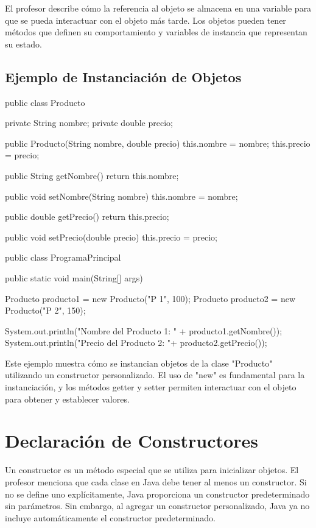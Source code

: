 \documentclass[a4paper]{report}
\begin{document}
El profesor describe cómo la referencia al objeto se almacena en una variable para que se pueda interactuar con el objeto más tarde. Los objetos pueden tener métodos que definen su comportamiento y variables de instancia que representan su estado.

\subsection{Ejemplo de Instanciación de Objetos}
\begin{roundedlst}
public class Producto {
    private String nombre;
    private double precio;

    public Producto(String nombre, double precio) {
        this.nombre = nombre;
        this.precio = precio;
    }

    public String getNombre() {
        return this.nombre;
    }

    public void setNombre(String nombre) {
        this.nombre = nombre;
    }

    public double getPrecio() {
       return this.precio;
    }

    public void setPrecio(double precio) {
        this.precio = precio;
    }
}

public class ProgramaPrincipal {
    public static void main(String[] args) {
        Producto producto1 = new Producto("P 1", 100);
        Producto producto2 = new Producto("P 2", 150);

        System.out.println("Nombre del Producto 1: " +
                         producto1.getNombre());
        System.out.println("Precio del Producto 2: "+                  
                        producto2.getPrecio());
    }
}
\end{roundedlst}

Este ejemplo muestra cómo se instancian objetos de la clase "Producto" utilizando un constructor personalizado. El uso de "new" es fundamental para la instanciación, y los métodos getter y setter permiten interactuar con el objeto para obtener y establecer valores.

\section{Declaración de Constructores}
Un constructor es un método especial que se utiliza para inicializar objetos. El profesor menciona que cada clase en Java debe tener al menos un constructor. Si no se define uno explícitamente, Java proporciona un constructor predeterminado sin parámetros. Sin embargo, al agregar un constructor personalizado, Java ya no incluye automáticamente el constructor predeterminado.
\end{document}
